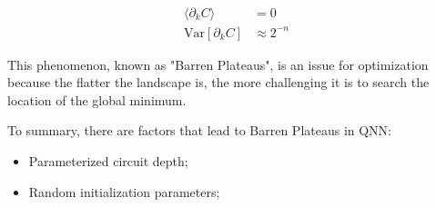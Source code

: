 \begin{align}
    \langle \partial_k C\rangle &= 0  \label{Vanish Gradient}\\
    \mathrm{Var}[\partial_k C] &\approx 2^{-n}  \label{Variance expo smaller}
\end{align}

This phenomenon, known as "Barren Plateaus", is an issue for optimization because the flatter the landscape is, the more challenging it is to search the location of the global minimum.

To summary, there are factors that lead to Barren Plateaus in QNN:
\begin{itemize}
    \item Parameterized circuit depth;
    \item Random initialization parameters;
\end{itemize}